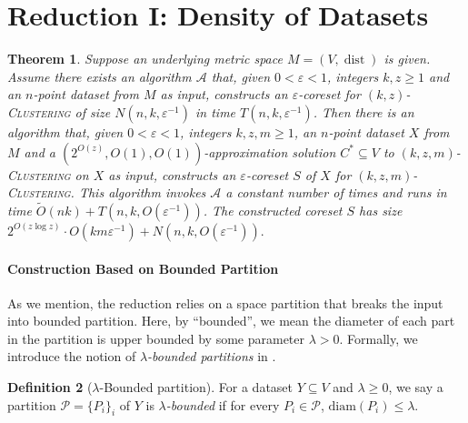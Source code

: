 \documentclass[letterpaper,11pt]{article}
\theoremstyle{plain}
\newtheorem{theorem}{Theorem}[section]
\theoremstyle{definition}
\newtheorem{definition}[theorem]{Definition}
\theoremstyle{remark}
\DeclareMathOperator{\dist}{dist}
\newcommand{\diam}{\mathrm{diam}}
\newcommand{\eps}{\varepsilon}
\newcommand{\calA}{\mathcal{A}}
\newcommand{\calP}{\mathcal{P}}
\newcommand{\ProblemName}[1]{\textsc{#1}}
\newcommand{\kzC}{\ProblemName{$(k,z)$-Clustering}\xspace}
\newcommand{\kzmC}{\ProblemName{$(k,z,m)$-Clustering}\xspace}
\begin{document}
%
 




\section{Reduction I: Density of Datasets}
\label{sec:Reduction-I}



\begin{theorem}
    \label{thm:reduction I}
    Suppose an underlying metric space $M=(V,\dist)$ is given.
    Assume there exists an algorithm $\calA$ that, given $0<\eps<1$, integers $k,z\ge 1$ and an $n$-point dataset from $M$ as input, constructs an $\eps$-coreset for \kzC of size $N(n,k,\eps^{-1})$ in time $T(n,k,\eps^{-1})$.
    Then there is an algorithm that, given $0<\eps<1$, integers $k,z,m\ge 1$, an $n$-point dataset $X$ from $M$ and a $(2^{O(z)},O(1),O(1))$-approximation solution $C^*\subseteq V$ to \kzmC on $X$ as input, constructs an $\eps$-coreset $S$ of $X$ for \kzmC.
    This algorithm invokes $\calA$ a constant number of times and runs in time $\tilde O(nk) + T(n,k,O(\eps^{-1}))$. The constructed coreset $S$ has size 
    $
        2^{O(z\log z)}\cdot O\left(km\eps^{-1}\right) +  N\left(n,k,O(\eps^{-1})\right).
    $
\end{theorem}



\paragraph{Construction Based on Bounded Partition}
As we mention, the reduction relies on a space partition that breaks the input into bounded partition. Here, by ``bounded'', we mean the diameter of each part in the partition is upper bounded by some parameter $\lambda > 0$. 
Formally, we introduce the notion of \emph{$\lambda$-bounded partitions} in . 
\begin{definition}[$\lambda$-Bounded partition]
    \label{def:bounded partition}
For a dataset $Y \subseteq V$ and  $\lambda\ge 0$, we say a partition $\calP = \{P_i \}_i$ of $Y$ is \emph{$\lambda$-bounded} if for every $P_i \in \calP$, $\diam(P_i)\le \lambda$.
\end{definition}
\end{document}
